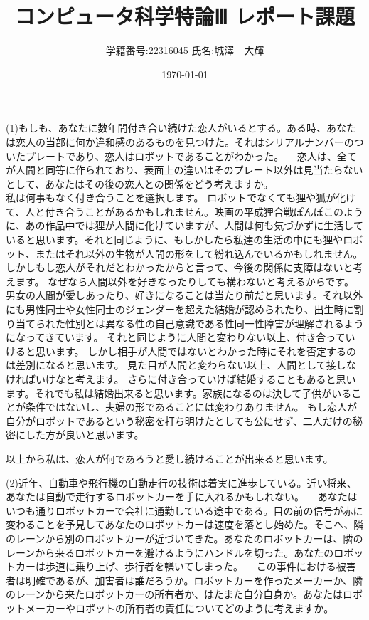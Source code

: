 \documentclass[11pt,a4paper]{jsarticle}
\title{コンピュータ科学特論Ⅲ レポート課題}
\author{学籍番号:22316045 
氏名:城澤　大輝}
\date{\today}
\begin{document}
\maketitle

(1)もしも、あなたに数年間付き合い続けた恋人がいるとする。ある時、あなたは恋人の当部に何か違和感のあるものを見つけた。それはシリアルナンバーのついたプレートであり、恋人はロボットであることがわかった。
　恋人は、全てが人間と同等に作られており、表面上の違いはそのプレート以外は見当たらないとして、あなたはその後の恋人との関係をどう考えますか。\\


私は何事もなく付き合うことを選択します。
ロボットでなくても狸や狐が化けて、人と付き合うことがあるかもしれません。映画の平成狸合戦ぽんぽこのように、あの作品中では狸が人間に化けていますが、人間は何も気づかずに生活していると思います。それと同じように、もしかしたら私達の生活の中にも狸やロボット、またはそれ以外の生物が人間の形をして紛れ込んでいるかもしれません。しかしもし恋人がそれだとわかったからと言って、今後の関係に支障はないと考えます。
なぜなら人間以外を好きなったりしても構わないと考えるからです。
男女の人間が愛しあったり、好きになることは当たり前だと思います。それ以外にも男性同士や女性同士のジェンダーを超えた結婚が認められたり、出生時に割り当てられた性別とは異なる性の自己意識である性同一性障害が理解されるようになってきています。
それと同じように人間と変わりない以上、付き合っていけると思います。
しかし相手が人間ではないとわかった時にそれを否定するのは差別になると思います。
見た目が人間と変わらない以上、人間として接しなければいけなと考えます。
さらに付き合っていけば結婚することもあると思います。それでも私は結婚出来ると思います。家族になるのは決して子供がいることが条件ではないし、夫婦の形であることには変わりありません。
もし恋人が自分がロボットであるという秘密を打ち明けたとしても公にせず、二人だけの秘密にした方が良いと思います。

以上から私は、恋人が何であろうと愛し続けることが出来ると思います。

\newpage

(2)近年、自動車や飛行機の自動走行の技術は着実に進歩している。近い将来、あなたは自動で走行するロボットカーを手に入れるかもしれない。
　あなたはいつも通りロボットカーで会社に通勤している途中である。目の前の信号が赤に変わることを予見してあなたのロボットカーは速度を落とし始めた。そこへ、隣のレーンから別のロボットカーが近づいてきた。あなたのロボットカーは、隣のレーンから来るロボットカーを避けるようにハンドルを切った。あなたのロボットカーは歩道に乗り上げ、歩行者を轢いてしまった。
　この事件における被害者は明確であるが、加害者は誰だろうか。ロボットカーを作ったメーカーか、隣のレーンから来たロボットカーの所有者か、はたまた自分自身か。あなたはロボットメーカーやロボットの所有者の責任についてどのように考えますか。\\
 
\end{document}
